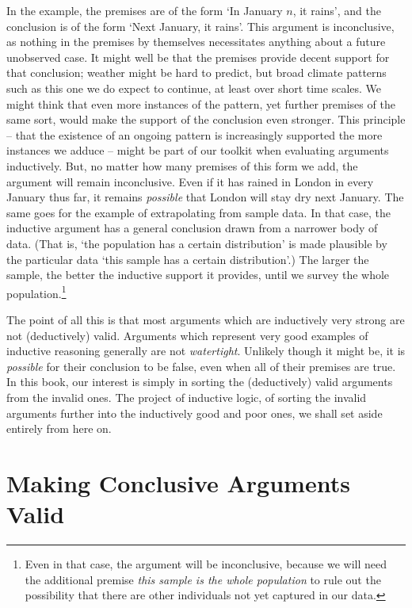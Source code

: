 In the example, the premises are of the form `In January $n$, it rains', and the conclusion is of the form `Next January, it rains'. This argument is inconclusive, as nothing in the premises by themselves necessitates anything about a future unobserved case. It might well be that the premises provide decent support for that conclusion; weather might be hard to predict, but broad climate patterns such as this one we do expect to continue, at least over short time scales. We might think that even more instances of the pattern, yet further premises of the same sort, would make the support of the conclusion even stronger. This principle – that the existence of an ongoing pattern is increasingly supported the more instances we adduce – might be part of our toolkit when evaluating arguments inductively. But, no matter how many premises of this form we add, the argument will remain inconclusive. Even if it has rained in London in every January thus far, it remains \emph{possible} that London will stay dry next January. The same goes for the example of extrapolating from sample data. In that case, the inductive argument has a general conclusion drawn from a narrower body of data. (That is, `the population has a certain distribution' is made plausible by the particular data `this sample has a certain distribution'.) The larger the sample, the better the inductive support it provides, until we survey the whole population.\footnote{Even in that case, the argument will be inconclusive, because we will need the additional premise \emph{this sample is the whole population} to rule out the possibility that there are other individuals not yet captured in our data.}



The point of all this is that most arguments which are inductively very strong are not (deductively) valid. Arguments which represent very good examples of inductive reasoning generally are not \emph{watertight}. Unlikely though it might be, it is \emph{possible} for their conclusion to be false, even when all of their premises are true. In this book, our interest is simply in sorting the (deductively) valid arguments from the invalid ones. The project of inductive logic, of sorting the invalid arguments further into the inductively good and poor ones, we shall set aside entirely from here on. 



\section{Making Conclusive Arguments Valid} %

